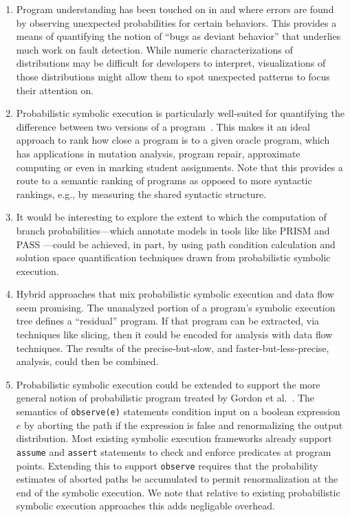 \begin{enumerate}

\item Program understanding has been touched on in \cite{Geldenhuys2012} and \cite{Filieri2015} where errors are found by observing unexpected probabilities for certain behaviors.  This provides a means of quantifying the notion of ``bugs as deviant behavior'' that underlies much work on fault detection.   While numeric characterizations of distributions may be difficult for developers to interpret, visualizations of those distributions might allow them to spot unexpected patterns to focus their attention on.

\item Probabilistic symbolic execution is particularly well-suited for quantifying the difference between two versions of a program~\cite{Filieri2015b}. This makes it an ideal approach to rank how close a program is to a given oracle program, which has applications in mutation analysis, program repair, approximate computing or even in marking student assignments.  Note that this provides a route to a semantic ranking of programs as opposed to more syntactic rankings, e.g., by measuring the shared syntactic structure. 

\item It would be interesting to explore the extent
to which the computation of branch probabilities---which annotate
models in tools like like PRISM \cite{kwiatkowska2011prism} and 
PASS \cite{hahn2010pass}---could be achieved,
in part, by using path condition calculation and solution
space quantification techniques drawn from probabilistic symbolic
execution.  

\item Hybrid approaches that mix probabilistic symbolic execution
and data flow seem promising.  The unanalyzed portion of a program's
symbolic execution tree defines a ``residual'' program.  If that
program can be extracted, via techniques like slicing, then it
could be encoded for analysis with data flow techniques.  The
results of the precise-but-slow, and faster-but-less-precise,
analysis, could then be combined. 

\item Probabilistic symbolic execution could be extended to support
the more general notion of probabilistic program treated by Gordon 
et al.~\cite{Gordon2014}.  The semantics of
\texttt{observe(e)} statements condition input on a boolean expression
$e$ by aborting the path if the expression is false and renormalizing the
output distribution.
Most existing symbolic execution frameworks already support \texttt{assume} and \texttt{assert} statements to check and enforce predicates at program points.
Extending this to support \texttt{observe} requires that the probability
estimates of aborted paths be accumulated to permit renormalization at the
end of the symbolic execution.  We note that relative to existing probabilistic
symbolic execution approaches this adds negligable overhead.


\end{enumerate}
